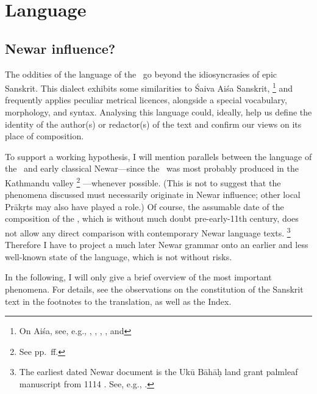 
\section{Language}\label{language}

\subsection{Newar influence?}
\label{newar}

The oddities of the language of the \VSS\ go beyond the idiosyncrasies of epic Sanskrit.
This dialect exhibits some similarities to Śaiva Aiśa Sanskrit,%
		\footnote{On Aiśa, see, e.g., , 
								  ,
						          , 
						          , and
						          } 
and frequently applies peculiar metrical licences, 
alongside a special vocabulary, morphology, and syntax.
Analysing this language could, ideally, help us
define the identity of the author(s) or redactor(s) of the text
and confirm our views on its place of composition.

To support a working hypothesis, I will mention parallels
between the language of the \VSS\ and early classical 
Newar---since the \VSS\ was most probably produced in the 
Kathmandu valley%
		\footnote{See pp.~\pageref{provenance}\thinspace ff.}%
---whenever possible. (This is not to suggest that the phenomena
discussed must necessarily originate in  Newar influence;
other local Prākṛts may also have played a role.)
Of course, the assumable date
of the composition of the \VSS, which is without much doubt
pre-early-11th century, does not allow any direct
comparison with contemporary Newar language texts.%
	\footnote{The earliest dated Newar document is 
			the Ukū Bāhāḥ land grant palmleaf manuscript from
			1114 \CE. See, e.g., .}
Therefore I have to project a much later Newar grammar
onto an earlier and less well-known 
state of the language, which is not without risks.

In the following, I will only give a brief overview of the most
important phenomena. For details, see the observations 
on the constitution of the Sanskrit text in the footnotes 
to the translation, as well as the Index.


